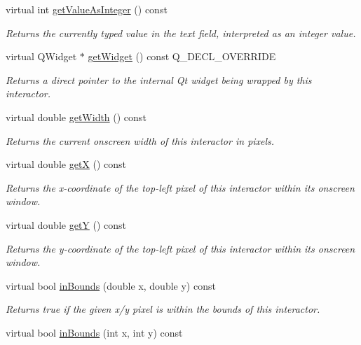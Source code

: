 \begin{DoxyCompactItemize}
virtual int \mbox{\hyperlink{classGTextField_a1cbf643145c03ed4c238d085fc88cf33}{get\+Value\+As\+Integer}} () const
\begin{DoxyCompactList}\small\item\em Returns the currently typed value in the text field, interpreted as an integer value. \end{DoxyCompactList}\item 
virtual Q\+Widget $\ast$ \mbox{\hyperlink{classGTextField_a326ee51b5561f807df7b29a1c101f7fd}{get\+Widget}} () const Q\+\_\+\+D\+E\+C\+L\+\_\+\+O\+V\+E\+R\+R\+I\+DE
\begin{DoxyCompactList}\small\item\em Returns a direct pointer to the internal Qt widget being wrapped by this interactor. \end{DoxyCompactList}\item 
virtual double \mbox{\hyperlink{classGInteractor_a0ed2965abd4f5701d2cadf71239faf19}{get\+Width}} () const
\begin{DoxyCompactList}\small\item\em Returns the current onscreen width of this interactor in pixels. \end{DoxyCompactList}\item 
virtual double \mbox{\hyperlink{classGInteractor_a344385751bee0720059403940d57a13e}{getX}} () const
\begin{DoxyCompactList}\small\item\em Returns the x-\/coordinate of the top-\/left pixel of this interactor within its onscreen window. \end{DoxyCompactList}\item 
virtual double \mbox{\hyperlink{classGInteractor_aafa51c7f8f38a09febbb9ce7853f77b4}{getY}} () const
\begin{DoxyCompactList}\small\item\em Returns the y-\/coordinate of the top-\/left pixel of this interactor within its onscreen window. \end{DoxyCompactList}\item 
virtual bool \mbox{\hyperlink{classGInteractor_afc480f652b8c5f1fb255e2269ce68879}{in\+Bounds}} (double x, double y) const
\begin{DoxyCompactList}\small\item\em Returns true if the given x/y pixel is within the bounds of this interactor. \end{DoxyCompactList}\item 
virtual bool \mbox{\hyperlink{classGInteractor_ae6d7982c1c627b677a5e776ca86118ed}{in\+Bounds}} (int x, int y) const

\end{DoxyCompactItemize}
